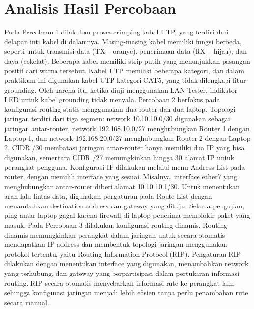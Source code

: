 \section{Analisis Hasil Percobaan}
Pada Percobaan 1 dilakukan proses crimping kabel UTP, yang terdiri dari delapan inti kabel di dalamnya. Masing-masing kabel memiliki fungsi berbeda, seperti untuk transmisi data (TX – oranye), penerimaan data (RX – hijau), dan daya (cokelat). Beberapa kabel memiliki strip putih yang menunjukkan pasangan positif dari warna tersebut. Kabel UTP memiliki beberapa kategori, dan dalam praktikum ini digunakan kabel UTP kategori CAT5, yang tidak dilengkapi fitur grounding. Oleh karena itu, ketika diuji menggunakan LAN Tester, indikator LED untuk kabel grounding tidak menyala. Percobaan 2 berfokus pada konfigurasi routing statis menggunakan dua router dan dua laptop. Topologi jaringan terdiri dari tiga segmen: network 10.10.10.0/30 digunakan sebagai jaringan antar-router, network 192.168.10.0/27 menghubungkan Router 1 dengan Laptop 1, dan network 192.168.20.0/27 menghubungkan Router 2 dengan Laptop 2. CIDR /30 membatasi jaringan antar-router hanya memiliki dua IP yang bisa digunakan, sementara CIDR /27 memungkinkan hingga 30 alamat IP untuk perangkat pengguna. Konfigurasi IP dilakukan melalui menu Address List pada router, dengan memilih interface yang sesuai. Misalnya, interface ether7 yang menghubungkan antar-router diberi alamat 10.10.10.1/30. Untuk menentukan arah lalu lintas data, digunakan pengaturan pada Route List dengan menambahkan destination address dan gateway yang dituju. Selama pengujian, ping antar laptop gagal karena firewall di laptop penerima memblokir paket yang masuk. Pada Percobaan 3 dilakukan konfigurasi routing dinamis. Routing dinamis memungkinkan perangkat dalam jaringan untuk secara otomatis mendapatkan IP address dan membentuk topologi jaringan menggunakan protokol tertentu, yaitu Routing Information Protocol (RIP). Pengaturan RIP dilakukan dengan menentukan interface yang digunakan, menambahkan network yang terhubung, dan gateway yang berpartisipasi dalam pertukaran informasi routing. RIP secara otomatis menyebarkan informasi rute ke perangkat lain, sehingga konfigurasi jaringan menjadi lebih efisien tanpa perlu penambahan rute secara manual.



